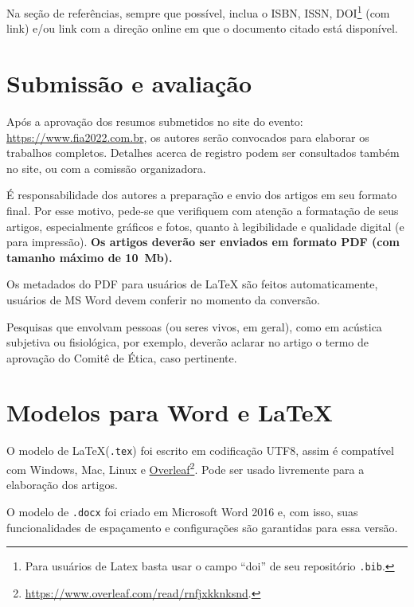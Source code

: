 \documentclass[12pt, a4paper, twoside, twocolumn]{article}
\begin{document}
Na seção de referências, sempre que possível, inclua o ISBN, ISSN, DOI\footnote{Para usuários de Latex basta usar o campo ``doi'' de seu repositório \texttt{.bib}.} (com link) e/ou link com a direção online em que o documento citado está disponível.

\section{Submissão e avaliação}

Após a aprovação dos resumos submetidos no site do evento: \url{https://www.fia2022.com.br}, os autores serão convocados para elaborar os trabalhos completos.
Detalhes acerca de registro podem ser consultados também no site, ou com a comissão organizadora.

É responsabilidade dos autores a preparação e envio dos artigos em seu formato final. Por esse motivo, pede-se que verifiquem com atenção a formatação de seus artigos, especialmente gráficos e fotos, quanto à legibilidade e qualidade digital (e para impressão). \textbf{Os artigos deverão ser enviados em formato PDF (com tamanho máximo de 10~Mb).} 

Os metadados do PDF para usuários de \LaTeX\xspace são feitos automaticamente, usuários de MS Word devem conferir no momento da conversão.


Pesquisas que envolvam pessoas (ou seres vivos, em geral), como em acústica subjetiva ou fisiológica, por exemplo, deverão aclarar no artigo o termo de aprovação do Comitê de Ética, caso pertinente.

\section{Modelos para Word e \LaTeX}

O modelo de \LaTeX\xspace (\texttt{.tex}) foi escrito em codificação UTF8, assim é compatível com Windows, Mac, Linux e \href{https://www.overleaf.com/read/rnfjxkknksnd}{Overleaf}\footnote{\url{https://www.overleaf.com/read/rnfjxkknksnd}.}. Pode ser usado livremente para a elaboração dos artigos.

O modelo de \texttt{.docx} foi criado em Microsoft Word 2016 e, com isso, suas funcionalidades de espaçamento e configurações são garantidas para essa versão.
\end{document}
